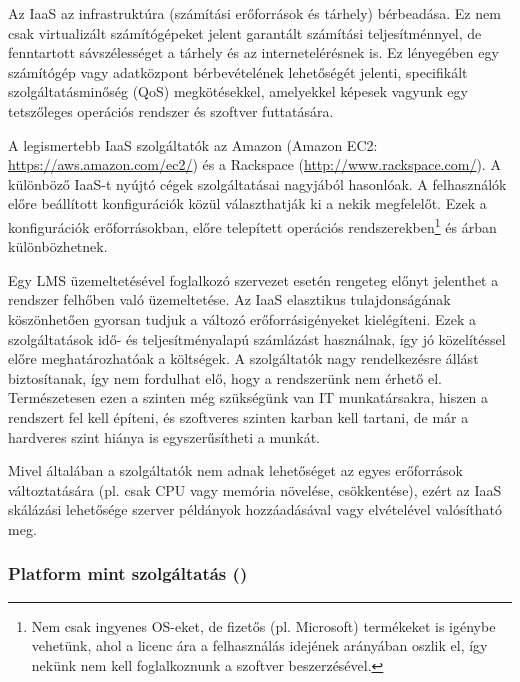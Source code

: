 Az IaaS az infrastruktúra (számítási erőforrások és tárhely) bérbeadása. Ez nem csak virtualizált számítógépeket jelent garantált számítási teljesítménnyel, de fenntartott sávszélességet a tárhely és az internetelérésnek is. Ez lényegében egy számítógép vagy adatközpont bérbevételének lehetőségét jelenti, specifikált szolgáltatásminőség (QoS) megkötésekkel, amelyekkel képesek vagyunk egy tetszőleges operációs rendszer és szoftver futtatására\cite{ccwlinux}.

A legismertebb IaaS szolgáltatók az Amazon (Amazon EC2: \href{https://aws.amazon.com/ec2/}{https://aws.amazon.com/ec2/}) és a Rackspace (\href{http://www.rackspace.com/}{http://www.rackspace.com/}). A különböző IaaS-t nyújtó cégek szolgáltatásai nagyjából hasonlóak. A felhasználók előre beállított konfigurációk közül választhatják ki a nekik megfelelőt. Ezek a konfigurációk erőforrásokban, előre telepített operációs rendszerekben\footnote{Nem csak ingyenes OS-eket, de fizetős (pl. Microsoft) termékeket is igénybe vehetünk, ahol a licenc ára a felhasználás idejének arányában oszlik el, így nekünk nem kell foglalkoznunk a szoftver beszerzésével.} és árban különbözhetnek.

Egy LMS üzemeltetésével foglalkozó szervezet esetén rengeteg előnyt jelenthet a rendszer felhőben való üzemeltetése. Az IaaS elasztikus tulajdonságának köszönhetően gyorsan tudjuk a változó erőforrásigényeket kielégíteni. Ezek a szolgáltatások idő- és teljesítményalapú számlázást használnak, így jó közelítéssel előre meghatározhatóak a költségek. A szolgáltatók nagy rendelkezésre állást biztosítanak, így nem fordulhat elő, hogy a rendszerünk nem érhető el. Természetesen ezen a szinten még szükségünk van IT munkatársakra, hiszen a rendszert fel kell építeni, és szoftveres szinten karban kell tartani, de már a hardveres szint hiánya is egyszerűsítheti a munkát.

Mivel általában a szolgáltatók nem adnak lehetőséget az egyes erőforrások változtatására (pl. csak CPU vagy memória növelése, csökkentése), ezért 
az IaaS skálázási lehetősége szerver példányok hozzáadásával vagy elvételével valósítható meg.
\subsubsection{Platform mint szolgáltatás ()}

